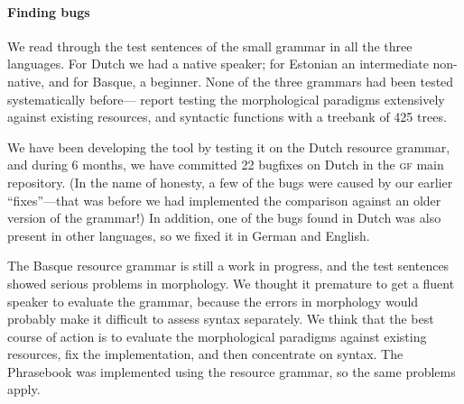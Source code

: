 \documentclass[11pt]{article}
\def\gf{\textsc{gf}}
\newcommand{\todo}[1]{{\color{cyan}\textbf{[TODO: }#1\textbf{]}}}
\begin{document}


\paragraph{Finding bugs} 
We read through the test sentences of the small grammar in all the
three languages. 
For Dutch we had a native speaker; for Estonian an intermediate non-native,
and for Basque, a beginner. None of the three grammars had been tested
systematically before---\cite{listenmaa_kaljurand2014} report testing
the morphological paradigms extensively against existing resources,
and syntactic functions with a treebank of 425 trees.

We have been developing the tool by testing it on the Dutch resource
grammar, and during 6 months, we have committed 22 bugfixes on Dutch
in the \gf{} main repository. (In the name of honesty, a few of the bugs were
caused by our earlier ``fixes''---that was before we had implemented
the comparison against an older version of the grammar!) In addition,
one of the bugs found in Dutch was also present in other languages, so
we fixed it in German and English.

The Basque resource grammar is still a work in progress, and the
test sentences showed serious problems in morphology.
We thought it premature to get a fluent speaker to evaluate the grammar,
because the errors in morphology would probably make it
difficult to assess syntax separately. We think that the best course
of action is to evaluate the morphological paradigms against existing
resources, fix the implementation, and then concentrate on syntax.
The Phrasebook was implemented using the resource grammar, so the
same problems apply.
\end{document}
